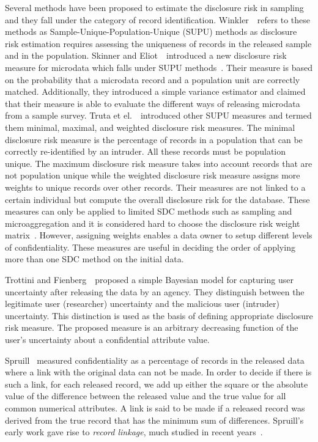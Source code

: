 \documentclass{llncs}
\begin{document}
Several methods have been proposed to estimate the disclosure risk
in sampling and they fall under the category of record
identification. Winkler~\cite{Winkler:Masking04}~refers to these
methods as Sample-Unique-Population-Unique (SUPU) methods as
disclosure risk estimation requires assessing the uniqueness of
records in the released sample and in the population. Skinner and
Eliot~\cite{Skinner-Elliot:Measure02}~introduced a new disclosure
risk measure for microdata which falls under SUPU
methods~\cite{Winkler:Masking04}. Their measure is based on the
probability 
that a microdata record and a population unit are correctly
matched.
Additionally, they introduced a
simple variance estimator and  claimed that their measure is
able to evaluate the different ways of releasing microdata from a
sample survey. Truta et
el.~\cite{Truta-Fotouhi:Disclosure04}~introduced other SUPU
measures and termed them minimal, maximal, and weighted
disclosure risk measures. The minimal disclosure risk measure is
the percentage of records in a population that can be correctly
re-identified by an intruder. All these records must be population
unique. The maximum disclosure risk measure takes into account
records that are not population unique while the weighted
disclosure risk measure assigns more weights to unique records
over other records. Their measures are not linked to a certain
individual but compute the overall disclosure risk for the
database. These measures can only be applied to limited SDC
methods such as sampling and microaggregation and it is considered
hard to choose the disclosure risk weight
matrix~\cite{Truta-Fotouhi:Disclosure04}. However, assigning
weights enables a data owner to setup different levels of
confidentiality. These measures are useful in deciding the order
of applying more than one SDC method on the initial data.

Trottini and Fienberg~\cite{Trottini-Fienberg:Modelling02}~proposed
a simple Bayesian model for capturing user uncertainty after
releasing the data by an agency. They distinguish between the
legitimate user (researcher) uncertainty and the malicious user
(intruder) uncertainty. This distinction is used as the basis of
defining appropriate disclosure risk measure. The proposed measure
is an arbitrary decreasing function of the user's uncertainty
about a confidential attribute value.

Spruill~\cite{Spruill:Measures82}
measured confidentiality as a percentage of records in the
released data where a link with the original
 data can not be made. In
order to decide if there is such a link, for each released record,
we add up either the square or the absolute value of the difference between the released value and the true
value for all common numerical attributes. A link is said to be made if a
released record was derived from the true record that has the
minimum sum of differences. Spruill's early work gave rise to \emph{record linkage}, much studied in recent years~\cite{FungWangChenYu2010}.
\end{document}
